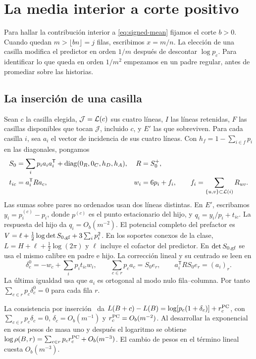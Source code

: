 \section{La media interior a corte positivo}\label{app:interior}
Para hallar la contribución interior a \eqref{eq:signed-mean} fijamos el corte \(b>0\).
Cuando quedan \(m>\lfloor bn\rfloor=j\) filas, escribimos \(x=m/n\).
La elección de una casilla modifica el predictor en orden \(1/m\) después de descontar
\(\log p_c\). Para identificar lo que queda en orden \(1/m^2\) empezamos en un padre regular,
antes de promediar sobre las historias.

\subsection{La inserción de una casilla}
Sean \(c\) la casilla elegida, \(\mathcal J=\mathcal L(c)\) sus cuatro líneas, \(I\) las líneas retenidas,
\(F\) las casillas disponibles que tocan \(\mathcal J\), incluido \(c\), y \(E'\) las que sobreviven.
Para cada casilla \(i\), sea \(a_i\) el vector de incidencia de sus cuatro líneas.
Con \(h_f=1-\sum_{i\in f}p_i\) en las diagonales, pongamos
\begin{align*}
 S_0&=\sum_i p_i a_i a_i^{\mathsf T}+\operatorname{diag}(0_R,0_C,h_D,h_A),
 & R&=S_0^+,\\
 t_{ic}&=a_i^{\mathsf T}Ra_c,
 & w_i&=6p_i+f_i,\qquad f_i=\sum_{\{u,v\}\subset \mathcal L(i)}R_{uv}.
\end{align*}
Las sumas sobre pares no ordenados usan dos líneas distintas. En \(E'\), escribamos
\(y_i=p_i^{(c)}-p_i\), donde \(p^{(c)}\) es el punto estacionario del hijo, y
\(q_i=y_i/p_i+t_{ic}\). La respuesta del hijo da \(q_i=O_b(m^{-2})\).
El potencial completo del prefactor es
\(V=\ell+\tfrac12\log\det S_{0,\rm gf}+3\sum_i p_i^2\). En los soportes conexos de
la clase, \(L=H+\ell+\tfrac12\log(2\pi)\) y \(\ell\) incluye el cofactor del predictor.
En \(\det S_{0,\rm gf}\) se usa el mismo calibre en padre e hijo.
La corrección lineal y su centrado se leen en
\[
 \delta_c^0=-w_c+\sum_i p_i t_{ic}w_i,\qquad
 \sum_{c\in r}p_ca_c=S_0 e_r,\qquad a_i^{\mathsf T}RS_0 e_r=(a_i)_r .
\]
La última igualdad usa que \(a_i\) es ortogonal al modo nulo fila--columna.
Por tanto \(\sum_{c\in r}p_c\delta_c^0=0\) para cada fila \(r\).

La consistencia por inserción~\cite[Teorema 7.1 y Corolario 7.2]{pc} da
\(L(B+c)-L(B)=\log[p_c(1+\delta_c)]+r_c^{\rm PC}\), con
\(\sum_{c\in r}p_c\delta_c=0\), \(\delta_c=O_b(m^{-1})\) y \(r_c^{\rm PC}=O_b(m^{-2})\).
Al desarrollar la exponencial en esos pesos de masa uno y después el logaritmo se obtiene
\(\log\rho(B,r)=\sum_{c\in r}p_c r_c^{\rm PC}+O_b(m^{-3})\).
El cambio de pesos en el término lineal cuesta \(O_b(m^{-3})\).

